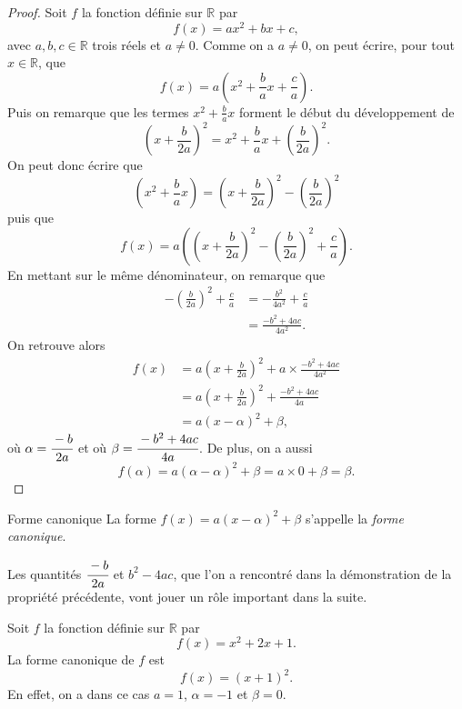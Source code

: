 \documentclass[11pt]{article}
\begin{document}
\begin{proof}
  Soit $f$ la fonction définie sur $\mathbb{R}$ par
  \[
    f(x) = ax^2+bx+c,
  \]
  avec $a,b,c\in\mathbb{R}$ trois réels et $a\neq0$. Comme on a $a\neq0$, on
  peut écrire, pour tout $x\in\mathbb{R}$, que
  \[
    f(x) = a\left( x^2+\frac{b}{a}x+\frac{c}{a} \right).
  \]
  Puis on remarque que les termes $x^2+\frac{b}{a}x$ forment le début du
  développement de
  \[
    \left(x+\frac{b}{2a}\right)^2 = x^2 +
    \frac{b}{a}x+\left(\frac{b}{2a}\right)^2.
  \]
  On peut donc écrire que
  \[
    \left( x^2+\frac{b}{a}x \right) = \left( x+\frac{b}{2a} \right)^2-\left(
    \frac{b}{2a} \right)^2
  \]
  puis que
  \[
    f(x) = a\left( \left( x+\frac{b}{2a} \right)^2-\left( \frac{b}{2a}
    \right)^2+\frac{c}{a} \right).
  \]
  En mettant sur le même dénominateur, on remarque que
  \begin{align*}
    -\left( \frac{b}{2a} \right)^2+\frac{c}{a} &= -\frac{b^2}{4a^2} +
    \frac{c}{a} \\
    &= \frac{-b^2+4ac}{4a^2}.
 \end{align*}
 On retrouve alors
 \begin{align*}
   f(x) &= a\left( x+\frac{b}{2a} \right)^2+a\times\frac{-b^2+4ac}{4a^2} \\
   &= a\left( x+\frac{b}{2a} \right)^2+\frac{-b^2+4ac}{4a} \\
   &= a\left( x-\alpha \right)^2+\beta,
 \end{align*}
 où $\alpha=\cfrac{-b}{2a}$ et où $\beta=\cfrac{-b^2+4ac}{4a}$. De plus, on a
 aussi 
 \[
   f(\alpha) = a\left( \alpha-\alpha \right)^2+\beta= a\times 0+\beta=\beta.
 \]
\end{proof}

\begin{defi}{Forme canonique}
  La forme $f(x) = a(x-\alpha)^2+\beta$ s'appelle la \emph{forme canonique}.
\end{defi}

\begin{rmq}
  Les quantités $\cfrac{-b}{2a}$ et $b^2-4ac$, que l'on a rencontré dans la
  démonstration de la propriété précédente, vont jouer un rôle important dans
  la suite.
\end{rmq}

\begin{exemple}
  Soit $f$ la fonction définie sur $\mathbb{R}$ par
  \[
    f(x) = x^2 + 2x + 1.
  \]
  La forme canonique de $f$ est 
  \[
    f(x) = (x+1)^2.
  \]
  En effet, on a dans ce cas $a=1$, $\alpha=-1$ et $\beta=0$.
\end{exemple}
\end{document}
